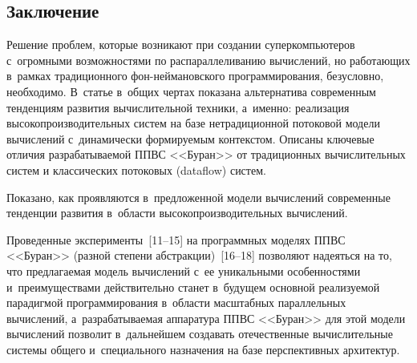 \begin{multicols}{2}
\section{Заключение}

  Решение проблем, которые возникают при созда\-нии суперкомпьютеров 
с~огромными возможностями по распараллеливанию вычислений, но 
работающих в~рамках традиционного фон-ней\-ма\-нов\-ско\-го 
программирования, безусловно, необходимо. В~статье в~общих чертах показана 
альтернатива современным тенденциям развития вычислительной техники, 
а~именно: реализация высокопроизводительных систем на базе нетрадиционной 
потоковой модели вычислений с~динамически формируемым контекстом. 
Описаны ключевые отличия разрабатываемой ППВС
<<Буран>> от традиционных вычислительных систем 
и классических потоковых (dataflow) систем.
  
  Показано, как проявляются в~предложенной модели вычислений 
современные тенденции развития в~области высокопроизводительных 
вычислений.
  
  Проведенные эксперименты~[11--15] на 
программных моделях ППВС <<Буран>> (разной степени  
абстракции)~[16--18] позволяют надеяться на то, что 
предлагаемая модель вычислений с~ее уникальными особенностями 
и~преимуществами действительно станет в~будущем основной реализуемой 
парадигмой программирования в~области масштабных параллельных 
вычислений, а~разрабатываемая аппаратура ППВС <<Буран>> для этой модели 
вычислений позволит в~дальнейшем создавать отечественные вычислительные 
системы общего и~специального назначения на базе перспективных архитектур.
  

\end{multicols}
